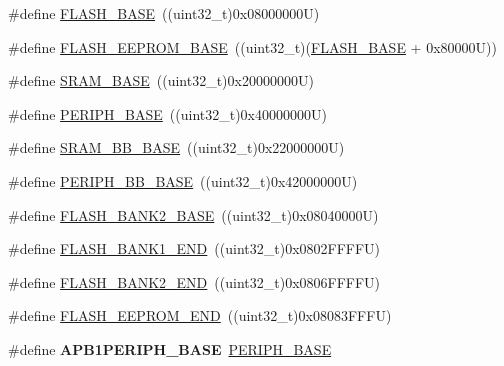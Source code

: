 \begin{DoxyCompactItemize}
\item 
\#define \hyperlink{group___peripheral__memory__map_ga23a9099a5f8fc9c6e253c0eecb2be8db}{F\-L\-A\-S\-H\-\_\-\-B\-A\-S\-E}~((uint32\-\_\-t)0x08000000\-U)
\item 
\#define \hyperlink{group___peripheral__memory__map_ga45b9071c81cb72a66e2e3195343fcb3a}{F\-L\-A\-S\-H\-\_\-\-E\-E\-P\-R\-O\-M\-\_\-\-B\-A\-S\-E}~((uint32\-\_\-t)(\hyperlink{group___peripheral__memory__map_ga23a9099a5f8fc9c6e253c0eecb2be8db}{F\-L\-A\-S\-H\-\_\-\-B\-A\-S\-E} + 0x80000\-U))
\item 
\#define \hyperlink{group___peripheral__memory__map_ga05e8f3d2e5868754a7cd88614955aecc}{S\-R\-A\-M\-\_\-\-B\-A\-S\-E}~((uint32\-\_\-t)0x20000000\-U)
\item 
\#define \hyperlink{group___peripheral__memory__map_ga9171f49478fa86d932f89e78e73b88b0}{P\-E\-R\-I\-P\-H\-\_\-\-B\-A\-S\-E}~((uint32\-\_\-t)0x40000000\-U)
\item 
\#define \hyperlink{group___peripheral__memory__map_gad3548b6e2f017f39d399358f3ac98454}{S\-R\-A\-M\-\_\-\-B\-B\-\_\-\-B\-A\-S\-E}~((uint32\-\_\-t)0x22000000\-U)
\item 
\#define \hyperlink{group___peripheral__memory__map_gaed7efc100877000845c236ccdc9e144a}{P\-E\-R\-I\-P\-H\-\_\-\-B\-B\-\_\-\-B\-A\-S\-E}~((uint32\-\_\-t)0x42000000\-U)
\item 
\#define \hyperlink{group___peripheral__memory__map_ga289057b052162696849fef25b656d3d9}{F\-L\-A\-S\-H\-\_\-\-B\-A\-N\-K2\-\_\-\-B\-A\-S\-E}~((uint32\-\_\-t)0x08040000\-U)
\item 
\#define \hyperlink{group___peripheral__memory__map_ga443a2786535d83e32dfdc2b29e379332}{F\-L\-A\-S\-H\-\_\-\-B\-A\-N\-K1\-\_\-\-E\-N\-D}~((uint32\-\_\-t)0x0802\-F\-F\-F\-F\-U)
\item 
\#define \hyperlink{group___peripheral__memory__map_gab24a21b645aaab8737af5603c3d11e71}{F\-L\-A\-S\-H\-\_\-\-B\-A\-N\-K2\-\_\-\-E\-N\-D}~((uint32\-\_\-t)0x0806\-F\-F\-F\-F\-U)
\item 
\#define \hyperlink{group___peripheral__memory__map_gac8cb9b66893a7c4bdff3258909af027a}{F\-L\-A\-S\-H\-\_\-\-E\-E\-P\-R\-O\-M\-\_\-\-E\-N\-D}~((uint32\-\_\-t)0x08083\-F\-F\-F\-U)
\item 
\hypertarget{group___peripheral__memory__map_ga45666d911f39addd4c8c0a0ac3388cfb}{\#define {\bfseries A\-P\-B1\-P\-E\-R\-I\-P\-H\-\_\-\-B\-A\-S\-E}~\hyperlink{group___peripheral__memory__map_ga9171f49478fa86d932f89e78e73b88b0}{P\-E\-R\-I\-P\-H\-\_\-\-B\-A\-S\-E}}\label{group___peripheral__memory__map_ga45666d911f39addd4c8c0a0ac3388cfb}


\end{DoxyCompactItemize}
